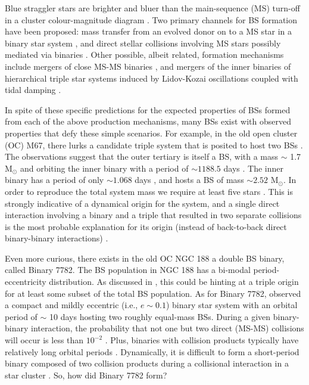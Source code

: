 \documentclass{aastex62}
\begin{document}
Blue straggler stars are brighter and bluer than the
main-sequence (MS) turn-off in a cluster colour-magnitude diagram
\citep[e.g.][]{1953AJ.....58...61S,2014ApJ...782...49S}.  Two primary
channels for BS formation have been proposed: mass transfer from an
evolved donor on to a MS star in a binary star system
\citep[e.g.][]{1964MNRAS.128..147M,1997A&A...328..143P,2009Natur.457..288K,2011MNRAS.410.2370L,2011Natur.478..356G},
and direct stellar collisions involving MS stars possibly
mediated via binaries
\citep[e.g.][]{1975AJ.....80..809H,1997A&A...328..130P,2007ApJ...661..210L,2013MNRAS.428..897L,2013MNRAS.429.1221H,2018arXiv181100058P}.
Other possible, albeit related, formation mechanisms include mergers
of close MS-MS binaries \cite{2018arXiv181100058P},
and mergers of the inner binaries of hierarchical triple star systems
induced by Lidov-Kozai oscillations coupled with tidal damping
\citep[e.g.][]{2009ApJ...697.1048P}.

In spite of these specific predictions for the expected properties of
BSs formed from each of the above production mechanisms, many BSs
exist with observed properties that defy these simple scenarios.  For
example, in the old open cluster (OC) M67, there lurks a candidate triple
system that is posited to host two BSs
\citep{2001A&A...375..375V,2003AJ....125..810S}.  The observations
suggest that the outer tertiary is itself a BS, with a mass $\sim$ 1.7
M$_{\odot}$ and orbiting the inner binary with a period of $\sim
1188.5$ days \citep{2003AJ....125..810S}.  The inner binary has a
period of only $\sim 1.068$ days \citep{2001A&A...375..375V}, and
hosts a BS of mass $\sim 2.52$ M$_{\odot}$.  In order to reproduce the total system mass 
we require at least five stars \citep{2011MNRAS.410.2370L}.  This is strongly indicative of a
dynamical origin for the system, and a single direct interaction
involving a binary and a triple that resulted in two separate
collisions is the most probable explanation for its origin
(instead of back-to-back direct binary-binary interactions)
\citep{2004MNRAS.350..615G,2011MNRAS.410.2370L}.  

Even more curious, there exists in the old OC NGC 188 a
double BS binary, called Binary 7782.  The BS
population in NGC 188 has a bi-modal period-eccentricity distribution.
As discussed in \citet{2011MNRAS.410.2370L}, this could be hinting at
a triple origin for at least some subset of the total BS population.
As for Binary 7782, \citet{2009Natur.462.1032M} observed a compact and
mildly eccentric (i.e., $e \sim 0.1$) binary star system with an
orbital period of $\sim$ 10 days hosting two roughly equal-mass BSs.  During a given binary-binary interaction, the probability
that not one but two direct (MS-MS) collisions will occur is less than
$10^{-2}$
\citep{1989AJ.....98..217L,2011MNRAS.410.2370L,2012MNRAS.425.2369L}.
Plus, binaries with collision products typically have relatively long
orbital periods \cite{2011Sci...334.1380F}. Dynamically, it is
difficult to form a short-period binary composed of two collision
products during a collisional interaction in a star cluster
\citep{2011Sci...334.1380F}.  So, how did Binary 7782 form?
\end{document}
